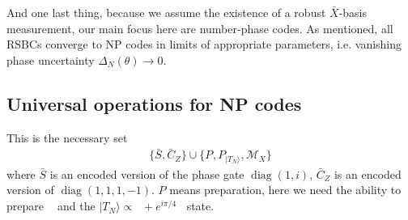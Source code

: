 \documentclass{article}
\DeclareMathOperator{\lgczero}{|\bar{0}\rangle}
\DeclareMathOperator{\lgcone}{|\bar{1}\rangle}
\DeclareMathOperator{\lgcplus}{|\bar{+}\rangle}
\DeclareMathOperator{\diag}{\text{diag}}
\begin{document}
And one last thing, because we assume the existence of a robust $\bar{X}$-basis measurement, our main focus here are number-phase codes. As mentioned, all RSBCs converge to NP codes in limits of appropriate parameters, i.e. vanishing phase uncertainty $\Delta_N(\theta)\to 0$.
\subsection{Universal operations for NP codes}
This is the necessary set
\begin{align}
    \{\bar{S}, \bar{C}_Z\} \cup \{P_{\lgcplus}, P_{|T_N\rangle}, \mathcal{M}_X\}
\end{align}
where $\bar{S}$ is an encoded version of the phase gate $\diag(1, i)$, $\bar{C}_Z$ is an encoded version of $\diag(1, 1, 1, -1)$. $P$ means preparation, here we need the ability to prepare $\lgcplus$ and the $|T_N\rangle\propto \lgczero+e^{i\pi/4}\lgcone$ state.  
\end{document}
